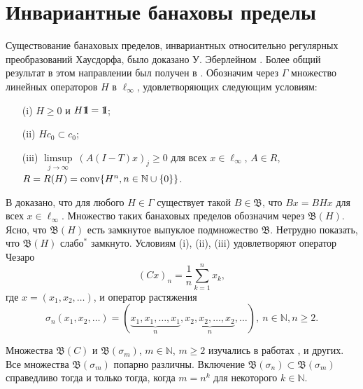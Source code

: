 \documentclass[12pt]{article}
\newcommand{\emm}{\mathrm{1\hspace{-0.3em} I}}
\newtheorem{prop}[thm]{Утверждение}
\def\N{{\mathbb{N}}}
\def\B{{\mathfrak{B}}}
\begin{document}
\section{Инвариантные банаховы пределы}\label{sec:inv}

Существование банаховых пределов, инвариантных относительно регулярных преобразований Хаусдорфа, было доказано У. Эберлейном \cite{Eberlein}. Более общий результат в этом направлении был получен в \cite{SS_JFA}.
Обозначим через $\Gamma$ множество линейных операторов $H$ в $\ell_\infty$, удовлетворяющих следующим условиям:
\begin{enumerate}
\item[(i)]
$H\geqslant0$ и $H\emm=\emm$;

\item[(ii)]
$Hc_0\subset c_0$;

\item[(iii)]
$\limsup\limits_{j\to\infty} \ (A(I-T)x)_j\geqslant0$ для всех $x\in
\ell_\infty$, $A\in
R$, $R=R(H)={\rm conv} \{H^n,n\in\mathbb N\cup\{0\}\}$.
\end{enumerate}

В \cite{SS_JFA} доказано, что для любого $H\in \Gamma$ существует такой $B\in\B$, что  $Bx=BHx$ для всех $x\in \ell_\infty$. Множество таких банаховых пределов обозначим через $\B(H)$. Ясно, что $\B(H)$ есть замкнутое выпуклое подмножество $\B$. Нетрудно показать, что $\B(H)$ слабо$^*$ замкнуто. Условиям (i), (ii), (iii) удовлетворяют оператор Чезаро
\begin{equation}\label{cesaro}
(Cx)_n=\frac1n\sum_{k=1}^n x_k,
\end{equation}
где $x=(x_1, x_2, \dots)$,
и оператор растяжения
$$\sigma_n(x_1, x_2, \dots)=(\underbrace{x_1, x_1, \dots, x_1}_{n}, \underbrace{x_2, x_2, \dots, x_2}_{n}, \dots), \ n\in\N, n\geqslant 2.$$

Множества $\B(C)$ и $\mathfrak B(\sigma_m)$, $m\in \N$, $m\geqslant 2$ изучались в работах \cite{SS_JFA}, \cite{ASSU2} и других. Все множества $\mathfrak B(\sigma_m)$ попарно различны. Включение $\mathfrak B(\sigma_n) \subset \mathfrak B(\sigma_m)$ справедливо тогда и только тогда, когда $m=n^k$ для некоторого $k\in \N$.


%
%
%
\end{document}
